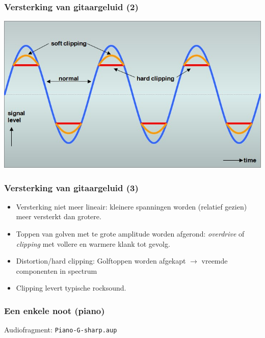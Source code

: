 \documentclass[compress, darktitle, framenumber, totalframenumber]{beamer}
\begin{document}
\begin{frame}
\frametitle{Versterking van gitaargeluid (2)}
\includegraphics[width=\textwidth]{images/clipping.png}
\end{frame}

\begin{frame}
\frametitle{Versterking van gitaargeluid (3)}
\begin{itemize}
\item Versterking niet meer lineair: kleinere spanningen worden (relatief gezien) meer versterkt dan grotere.
\item Toppen van golven met te grote amplitude worden afgerond: \textit{overdrive} of \textit{clipping} met vollere en warmere klank tot gevolg. 
\item Distortion/hard clipping: Golftoppen worden afgekapt $\rightarrow$ vreemde componenten in spectrum
\item Clipping levert typische rocksound.
\end{itemize}
\end{frame}

\begin{frame}
\frametitle{Een enkele noot (piano)}
\begin{block}{Audiofragment:}
\texttt{Piano-G-sharp.aup} 
\end{block}
\end{frame}
\end{document}
